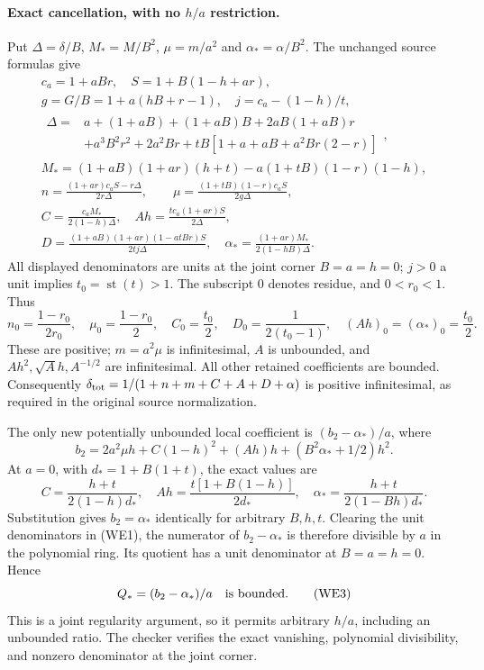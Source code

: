 \paragraph{Exact cancellation, with no $h/a$ restriction.}
Put $\Delta=\delta/B$, $M_*=M/B^2$, $\mu=m/a^2$ and
$\alpha_*=\alpha/B^2$. The unchanged source formulas give
\[
\begin{gathered}
 c_a=1+aBr,\quad S=1+B(1-h+ar),\\
 g=G/B=1+a(hB+r-1),\quad j=c_a-(1-h)/t,\\
 \begin{aligned}\Delta={}&a+(1+aB)+(1+aB)B+2aB(1+aB)r\\ &+a^3B^2r^2
       +2a^2Br+tB[1+a+aB+a^2Br(2-r)]\end{aligned},\\
 M_*=(1+aB)(1+ar)(h+t)-a(1+tB)(1-r)(1-h),\\
 n=\frac{(1+ar)c_aS-r\Delta}{2r\Delta},\qquad
 \mu=\frac{(1+tB)(1-r)c_aS}{2g\Delta},\\
 C=\frac{c_aM_*}{2(1-h)\Delta},\quad
 Ah=\frac{t c_a(1+ar)S}{2\Delta},\\
 D=\frac{(1+aB)(1+ar)(1-atBr)S}{2tj\Delta},\quad
 \alpha_* =\frac{(1+ar)M_*}{2(1-hB)\Delta}.       \end{gathered}\tag{WE1}
\]
All displayed denominators are units at the joint corner
$B=a=h=0$; $j>0$ a unit implies $t_0=\operatorname{st}(t)>1$.
The subscript $0$ denotes residue, and $0<r_0<1$.
Thus
\[
 n_0=\frac{1-r_0}{2r_0},\quad \mu_0=\frac{1-r_0}2,
 \quad C_0=\frac{t_0}2,\quad D_0=\frac1{2(t_0-1)},
 \quad (Ah)_0=(\alpha_*)_0=\frac{t_0}2.          \tag{WE2}
\]
These are positive; $m=a^2\mu$ is infinitesimal, $A$ is
unbounded, and $Ah^2,\sqrt A h,A^{-1/2}$ are infinitesimal.
All other retained coefficients are bounded. Consequently
$\delta_{\rm tot}=1/(1+n+m+C+A+D+\alpha)$ is positive
infinitesimal, as required in the original source normalization.

The only new potentially unbounded local coefficient is
$(b_2-\alpha_*)/a$, where
\[
 b_2=2a^2\mu h+C(1-h)^2+(Ah)h+(B^2\alpha_*+1/2)h^2.
\]
At $a=0$, with $d_*=1+B(1+t)$, the exact values are
\[
 C=\frac{h+t}{2(1-h)d_*},\quad
 Ah=\frac{t[1+B(1-h)]}{2d_*},\quad
 \alpha_* =\frac{h+t}{2(1-Bh)d_*}.
\]
Substitution gives $b_2=\alpha_*$ identically for arbitrary
$B,h,t$. Clearing the unit denominators in (WE1), the numerator
of $b_2-\alpha_*$ is therefore divisible by $a$ in the polynomial
ring. Its quotient has a unit denominator at $B=a=h=0$.
Hence
\[
 Q_*=(b_2-\alpha_*)/a\quad\hbox{is bounded}.       \tag{WE3}
\]
This is a joint regularity argument, so it permits arbitrary
$h/a$, including an unbounded ratio. The checker verifies the
exact vanishing, polynomial divisibility, and nonzero denominator
at the joint corner.

